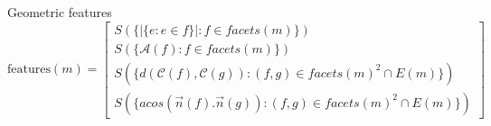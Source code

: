 \documentclass{beamer}
\begin{document}
            \begin{frame}{Geometric features}
                \begin{equation}\label{eq::feature_vec}
                    \text{features}(m) = \begin{bmatrix}
                            S(\{\vert \{e: e \in f\} \vert : f \in facets(m)\})\\
                            S(\{\mathscr{A}(f) : f \in facets(m)\})\\
                            S(\{d(\mathscr{C}(f), \mathscr{C}(g)) : (f, g) \in facets(m)^2 \cap E(m)\})\\
                            S(\{acos(\vec{n}(f) . \vec{n}(g)) : (f, g) \in facets(m)^2 \cap E(m)\})
                    \end{bmatrix}
                \end{equation}
                \begin{itemize}
                \end{itemize}
            \end{frame}
\end{document}

